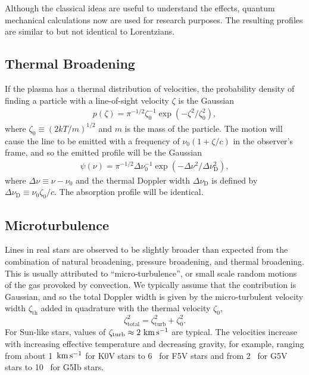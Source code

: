 Although the classical ideas are useful to understand the
effects, quantum mechanical calculations now are used for
research purposes. The resulting profiles are similar to but
not identical to Lorentzians.


\newslide

\subsection{Thermal Broadening}

If the plasma has a thermal distribution of velocities, the
probability density of finding a particle with a
line-of-sight velocity $\zeta$ is the Gaussian
\begin{align}
p(\zeta) = \pi^{-1/2}\zeta_0^{-1} \exp(-\zeta^2/\zeta_0^2),
\end{align}
where $\zeta_0 \equiv (2kT/m)^{1/2}$ and $m$ is the mass of
the particle. The motion will cause the line to be emitted
with a frequency of $\nu_0(1 + \zeta/c)$ in the observer's
frame, and so the emitted profile will be the Gaussian
\begin{align}
\psi(\nu) = \pi^{-1/2}\Delta\nu_0^{-1} \exp(-\Delta\nu^2/\Delta\nu_\mathrm{D}^2),
\end{align}
where $\Delta\nu \equiv \nu - \nu_0$ and the thermal Doppler width
$\Delta\nu_\mathrm{D}$ is defined by $\Delta\nu_\mathrm{D}
\equiv \nu_0\zeta_0 / c$. The absorption profile will be
identical.

\newslide

\subsection{Microturbulence}

Lines in real stars are observed to be slightly broader than expected from the combination of natural broadening, pressure broadening, and thermal broadening. This is usually attributed to “micro-turbulence”, or small scale random motions of the gas provoked by convection. We typically assume that the contribution is Gaussian, and so the total Doppler width is given by the micro-turbulent velocity width $\zeta_\mathrm{th}$ added in quadrature with the thermal velocity $\zeta_0$,
$$
\zeta_\mathrm{total}^2 = \zeta_\mathrm{turb}^2 + \zeta_0^2.
$$
For Sun-like stars, values of $\zeta_\mathrm{turb} \approx 2~\mbox{$\mathrm{km\,s^{-1}}$}$ are typical. The velocities increase with increasing effective temperature and decreasing gravity, for example, ranging from about 1~$\mbox{$\mathrm{km\,s^{-1}}$}$ for K0V stars to 6~{\kms} for F5V stars and from 2~{\kms} for G5V stars to 10~{\kms} for G5Ib stars.

